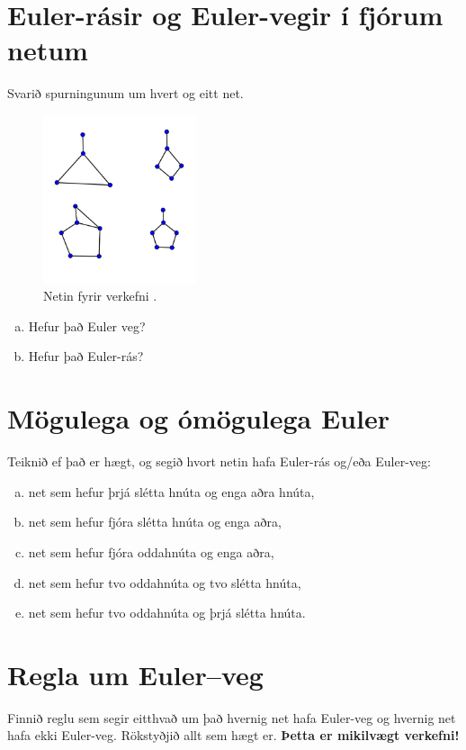 \documentclass[b5paper,12pt]{book}
\renewcommand*\thesection{\arabic{section}}
\begin{document}
\section{Euler-rásir og Euler-vegir í fjórum netum} Svarið spurningunum um hvert og eitt net.

\begin{figure}[h]
  \includegraphics[width=0.4\textwidth, center]{Myndir/Eulerspurning2.png}
  \caption*{Netin fyrir verkefni \thesection{}.}
\end{figure}

\begin{enumerate}[(a)]
\item Hefur það Euler veg?
\item Hefur það Euler-rás?
\end{enumerate}

\section{Mögulega og ómögulega Euler}
Teiknið ef það er hægt, og segið hvort netin hafa Euler-rás og/eða Euler-veg:
\begin{enumerate}[(a)]
\item net sem hefur þrjá slétta hnúta og enga aðra hnúta,
\item net sem hefur fjóra slétta hnúta og enga aðra,
\item net sem hefur fjóra oddahnúta og enga aðra,
\item net sem hefur tvo oddahnúta og tvo slétta hnúta,
\item net sem hefur tvo oddahnúta og þrjá slétta hnúta.
\end{enumerate}

\section{Regla um Euler--veg}
Finnið reglu sem segir eitthvað um það hvernig net hafa Euler-veg og hvernig net hafa ekki Euler-veg. Rökstyðjið allt sem hægt er. \textbf{Þetta er mikilvægt verkefni!}
\end{document}
